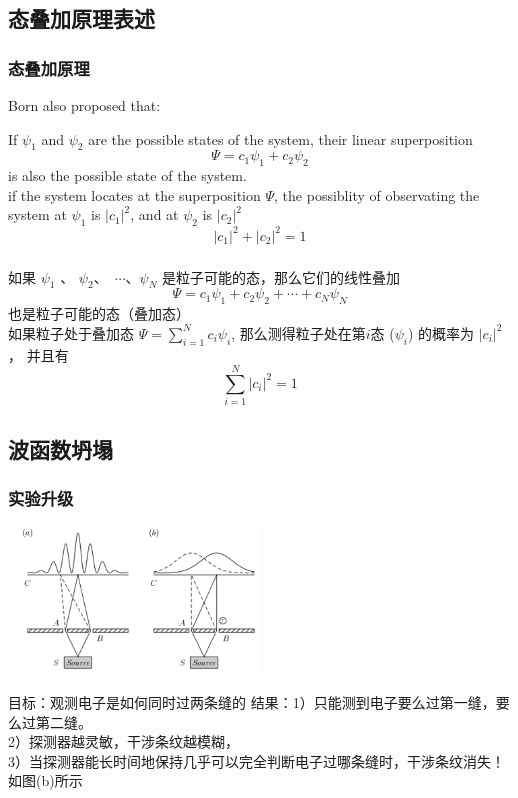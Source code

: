 \subsection{态叠加原理表述}

\begin{frame}
    \frametitle{态叠加原理}
    Born also proposed that: \\
    \begin{tcolorbox4}
    If $\psi_1$ and $\psi_2$ are the possible states of the system,
    their linear superposition \[ \Psi=c_1 \psi_1+ c_2\psi_2 \]
    is also the possible state of the system.\\
    if the system locates at the superposition $\Psi$, the possiblity of observating the system at $\psi_1$ is $|c_1|^2$, and at $\psi_2$ is $|c_2|^2$ \\
    \[|c_1 |^2 + |c_2 |^2 =1\]
    \end{tcolorbox4}
\end{frame}

\begin{frame}
    \frametitle{}
    \begin{tcolorbox4}[态叠加原理中文表述]
    如果 $\psi_1$ 、 $\psi_2$、 $\cdots$、$\psi_N$ 是粒子可能的态，那么它们的线性叠加
        $$ \Psi=c_1 \psi_1+ c_2\psi_2+\cdots+c_N\psi_N $$
    也是粒子可能的态（叠加态）\\   
    如果粒子处于叠加态 $\Psi=\sum\limits_{i=1}^N c_i \psi_i$,  
    那么测得粒子处在第$i$态 ($\psi_i$) 的概率为 $|c_i |^2$， 
    并且有  $$\sum_{i=1}^{N} |c_i|^2 =1$$
    \end{tcolorbox4}
\end{frame}

\subsection{波函数坍塌}

\begin{frame}
    \frametitle{实验升级}
    \begin{center}
        \includegraphics[width=0.5\textwidth]{figs/sup-4.png} \\
    \end{center} 
    \begin{itemize}
        \Item 目标：观测电子是如何同时过两条缝的
        \Item 结果：1）只能测到电子要么过第一缝，要么过第二缝。\\
        2）探测器越灵敏，干涉条纹越模糊，\\
        3）当探测器能长时间地保持几乎可以完全判断电子过哪条缝时，干涉条纹消失！如图(b)所示
    \end{itemize}
\end{frame}


